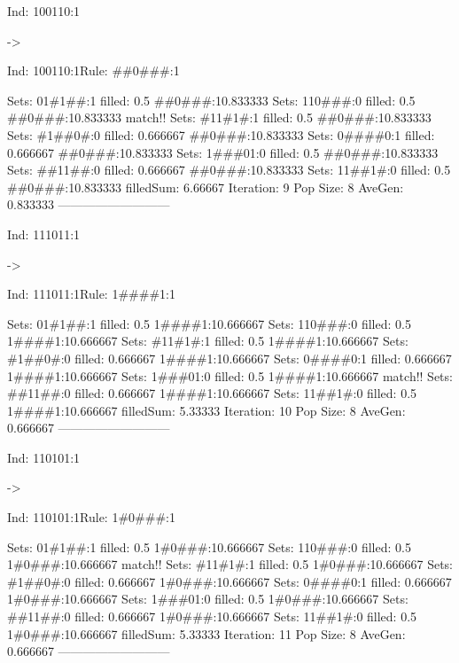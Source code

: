 \documentclass[12pt,openright,twoside,letterpaper,english,brazil,sumario=tradicional]{abntex2}
\begin{document}
\begin{flushleft}\ttfamily
\par Ind: 100110:1\end{flushleft} -> \begin{flushleft}\ttfamily
\par Ind: 100110:1Rule: \#\#0\#\#\#:1
\end{flushleft}  Sets:	01\#1\#\#:1 filled: 0.5 \#\#0\#\#\#:1{0.833333}
  Sets:	110\#\#\#:0 filled: 0.5 \#\#0\#\#\#:1{0.833333} match!!
  Sets:	\#11\#1\#:1 filled: 0.5 \#\#0\#\#\#:1{0.833333}
  Sets:	\#1\#\#0\#:0 filled: 0.666667 \#\#0\#\#\#:1{0.833333}
  Sets:	0\#\#\#\#0:1 filled: 0.666667 \#\#0\#\#\#:1{0.833333}
  Sets:	1\#\#\#01:0 filled: 0.5 \#\#0\#\#\#:1{0.833333}
  Sets:	\#\#11\#\#:0 filled: 0.666667 \#\#0\#\#\#:1{0.833333}
  Sets:	11\#\#1\#:0 filled: 0.5 \#\#0\#\#\#:1{0.833333}
filledSum: 6.66667
Iteration: 9 Pop Size: 8 AveGen: 0.833333
---------------------------

\begin{flushleft}\ttfamily
\par Ind: 111011:1\end{flushleft} -> \begin{flushleft}\ttfamily
\par Ind: 111011:1Rule: 1\#\#\#\#1:1
\end{flushleft}  Sets:	01\#1\#\#:1 filled: 0.5 1\#\#\#\#1:1{0.666667}
  Sets:	110\#\#\#:0 filled: 0.5 1\#\#\#\#1:1{0.666667}
  Sets:	\#11\#1\#:1 filled: 0.5 1\#\#\#\#1:1{0.666667}
  Sets:	\#1\#\#0\#:0 filled: 0.666667 1\#\#\#\#1:1{0.666667}
  Sets:	0\#\#\#\#0:1 filled: 0.666667 1\#\#\#\#1:1{0.666667}
  Sets:	1\#\#\#01:0 filled: 0.5 1\#\#\#\#1:1{0.666667} match!!
  Sets:	\#\#11\#\#:0 filled: 0.666667 1\#\#\#\#1:1{0.666667}
  Sets:	11\#\#1\#:0 filled: 0.5 1\#\#\#\#1:1{0.666667}
filledSum: 5.33333
Iteration: 10 Pop Size: 8 AveGen: 0.666667
---------------------------

\begin{flushleft}\ttfamily
\par Ind: 110101:1\end{flushleft} -> \begin{flushleft}\ttfamily
\par Ind: 110101:1Rule: 1\#0\#\#\#:1
\end{flushleft}  Sets:	01\#1\#\#:1 filled: 0.5 1\#0\#\#\#:1{0.666667}
  Sets:	110\#\#\#:0 filled: 0.5 1\#0\#\#\#:1{0.666667} match!!
  Sets:	\#11\#1\#:1 filled: 0.5 1\#0\#\#\#:1{0.666667}
  Sets:	\#1\#\#0\#:0 filled: 0.666667 1\#0\#\#\#:1{0.666667}
  Sets:	0\#\#\#\#0:1 filled: 0.666667 1\#0\#\#\#:1{0.666667}
  Sets:	1\#\#\#01:0 filled: 0.5 1\#0\#\#\#:1{0.666667}
  Sets:	\#\#11\#\#:0 filled: 0.666667 1\#0\#\#\#:1{0.666667}
  Sets:	11\#\#1\#:0 filled: 0.5 1\#0\#\#\#:1{0.666667}
filledSum: 5.33333
Iteration: 11 Pop Size: 8 AveGen: 0.666667
---------------------------
\end{document}
